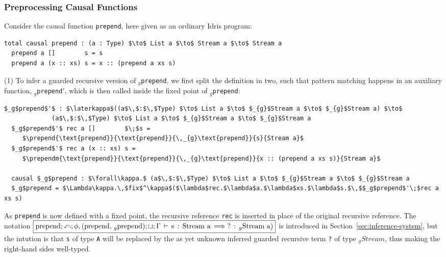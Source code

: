 \subsubsection{Preprocessing Causal Functions}
\label{sec:prepr-caus-funct}
 Consider the causal function \texttt{prepend}, here
given as an ordinary Idris program:
\begin{lstlisting}[mathescape]
  total causal prepend : (a : Type) $\to$ List a $\to$ Stream a $\to$ Stream a
  prepend a []        s = s
  prepend a (x :: xs) s = x :: (prepend a xs s)
\end{lstlisting}
(1) To infer a guarded recursive version of \texttt{$_g$prepend}, we first split the
definition in two, such that pattern matching happens in an auxiliary function,
\texttt{$_g$prepend$'$}, which is then called inside the fixed point of \texttt{$_g$prepend}:

\newcommand{\prepend}[5]{\ensuremath{{\boxed{#1;\causal;\phi,(#2,#3);\open;\Gamma\,\vdash\,\text{#4}\,:\,\text{#5}\,\infer
        \text{?}\,:\,_{g}\text{#5})}}}}
\newcommand{\prependm}[5]{\ensuremath{{\boxed{
            \begin{matrix*}[l] #1;\causal;\phi,(#2,#3);\open;\Gamma\,\vdash \\
                           \quad\text{#4}\,:\,\text{#5}\,\infer\,\text{?}\,:\,_{g}\text{#5})
            \end{matrix*}
            }}}}
\begin{lstlisting}[mathescape]
  $_g$prepend$'$ : $\laterkappa$((a$\,$:$\,$Type) $\to$ List a $\to$ $_{g}$Stream a $\to$ $_{g}$Stream a) $\to$ 
             (a$\,$:$\,$Type) $\to$ List a $\to$ $_{g}$Stream a $\to$ $_{g}$Stream a
  $_g$prepend$'$ rec a []        $\;$s = 
     $\prepend{\text{prepend}}{\text{prepend}}{\,_{g}\text{prepend}}{s}{Stream a}$
  $_g$prepend$'$ rec a (x :: xs) s = 
     $\prependm{\text{prepend}}{\text{prepend}}{\,_{g}\text{prepend}}{x :: (prepend a xs s)}{Stream a}$

  causal $_g$prepend : $\forall\kappa.$ (a$\,$:$\,$Type) $\to$ List a $\to$ $_{g}$Stream a $\to$ $_{g}$Stream a
  $_g$prepend = $\Lambda\kappa.\,$fix$^\kappa$($\lambda$rec.$\lambda$a.$\lambda$xs.$\lambda$s.$\,$$_g$prepend$'\;$rec a xs s)
\end{lstlisting}
As \texttt{prepend} is now defined with a fixed point, the recursive reference
\texttt{rec} is inserted in place of the original recursive reference. The
notation \prepend{\text{prepend}}{\text{prepend}}{\,_{g}\text{prepend}}{s}{Stream a} is introduced in
Section~\ref{sec:inference-system}, but the intution is that \texttt{s} of type
\texttt{A} will be replaced by the as yet unknown inferred guarded recursive term \texttt{?} of
type $_{g}Stream$, thus making the right-hand sides well-typed.

